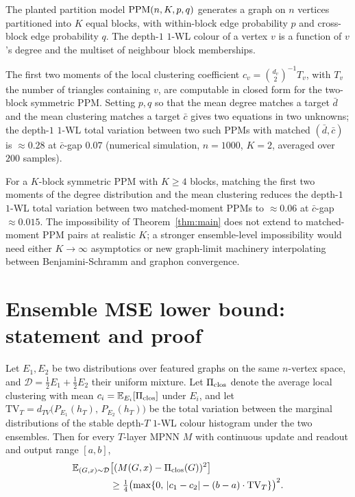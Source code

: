 The planted partition model $\mathrm{PPM}(n, K, p, q)$ generates a graph on
$n$ vertices partitioned into $K$ equal blocks, with within-block
edge probability $p$ and cross-block edge probability $q$. The
depth-$1$ $1$-WL colour of a vertex $v$ is a function of $v$'s
degree and the multiset of neighbour block memberships.

The first two moments of the local clustering coefficient
$c_v = \binom{d_v}{2}^{-1} T_v$, with $T_v$ the number of triangles
containing $v$, are computable in closed form for the two-block
symmetric PPM. Setting $p, q$ so that the mean degree matches a
target $\bar d$ and the mean clustering matches a target $\bar c$
gives two equations in two unknowns; the depth-$1$ $1$-WL total
variation between two such PPMs with matched $(\bar d, \bar c)$ is
$\approx 0.28$ at $\bar c$-gap $0.07$ (numerical simulation, $n =
1000$, $K = 2$, averaged over $200$ samples).

For a $K$-block symmetric PPM with $K \ge 4$ blocks, matching the
first two moments of the degree distribution and the mean
clustering reduces the depth-$1$ $1$-WL total variation between two
matched-moment PPMs to $\approx 0.06$ at $\bar c$-gap $\approx
0.015$. The impossibility of Theorem~\ref{thm:main} does not
extend to matched-moment PPM pairs at realistic $K$; a stronger
ensemble-level impossibility would need either $K \to \infty$
asymptotics or new graph-limit machinery interpolating between
Benjamini-Schramm and graphon convergence.

\section{Ensemble MSE lower bound: statement and proof}\label{app:entangle}

\begin{theorem}\label{thm:main-general}
Let $E_1, E_2$ be two distributions over featured graphs on the
same $n$-vertex space, and $\mathcal{D} = \tfrac{1}{2} E_1 +
\tfrac{1}{2} E_2$ their uniform mixture. Let $\Pi_{\mathrm{clos}}$
denote the average local clustering with mean $c_i =
\mathbb{E}_{E_i}[\Pi_{\mathrm{clos}}]$ under $E_i$, and let
$\mathrm{TV}_T = d_{TV}\bigl(P_{E_1}(h_T),\, P_{E_2}(h_T)\bigr)$
be the total variation between the marginal distributions of
the stable depth-$T$ $1$-WL colour histogram under the two
ensembles. Then for every $T$-layer MPNN $M$ with continuous
update and readout and output range $[a, b]$,
\begin{align*}
\mathbb{E}_{(G, x) \sim \mathcal{D}}&\bigl[(M(G, x) - \Pi_{\mathrm{clos}}(G))^2\bigr] \\
&\ge \tfrac{1}{4}\bigl(\max\{0,\, |c_1 - c_2| - (b - a) \cdot \mathrm{TV}_T\}\bigr)^2.
\end{align*}
\end{theorem}


